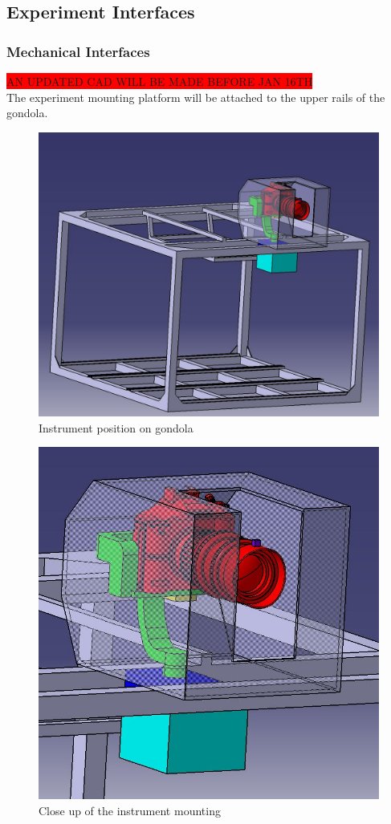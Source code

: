 \subsection{Experiment Interfaces}

\subsubsection{Mechanical Interfaces}
\label{sec:4.2.1}

\colorbox{red}{AN UPDATED CAD WILL BE MADE BEFORE JAN 16TH}\\
The experiment mounting platform will be attached to the upper rails of the gondola.



\begin{figure}[H]
    \centering
	\includegraphics[width=0.6\linewidth]{4-experiment-design/img/interfaces/Screenshot_Experiment.jpg}
	\caption{Instrument position on gondola}
\end{figure}

\begin{figure}[H]
    \centering
	\includegraphics[width=0.6\linewidth]{4-experiment-design/img/interfaces/Screenshot_Close_Up.jpg}
	\caption{Close up of the instrument mounting}
\end{figure}


